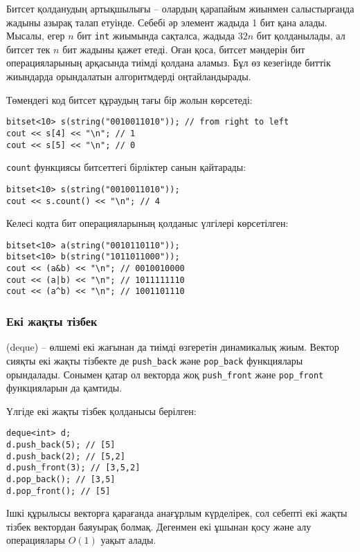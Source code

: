 Битсет қолданудың артықшылығы -- олардың қарапайым
жиынмен салыстырғанда жадыны азырақ талап етуінде. Себебі 
әр элемент жадыда 1 бит қана алады.
Мысалы, егер $n$ бит \texttt{int} жиымында сақталса,
жадыда $32n$ бит қолданылады, ал битсет тек $n$ бит
жадыны қажет етеді. Оған қоса, битсет мәндерін бит операцияларының арқасында 
тиімді қолдана аламыз. Бұл өз кезегінде биттік жиындарда орындалатын алгоритмдерді
оңтайландырады.

Төмендегі код битсет құраудың тағы бір жолын көрсетеді:
\begin{lstlisting}
bitset<10> s(string("0010011010")); // from right to left
cout << s[4] << "\n"; // 1
cout << s[5] << "\n"; // 0
\end{lstlisting}

\texttt{count} функциясы битсеттегі бірліктер санын қайтарады:

\begin{lstlisting}
bitset<10> s(string("0010011010"));
cout << s.count() << "\n"; // 4
\end{lstlisting}

Келесі кодта бит операцияларының қолданыс үлгілері көрсетілген:
\begin{lstlisting}
bitset<10> a(string("0010110110"));
bitset<10> b(string("1011011000"));
cout << (a&b) << "\n"; // 0010010000
cout << (a|b) << "\n"; // 1011111110
cout << (a^b) << "\n"; // 1001101110
\end{lstlisting}

\subsubsection{Екі жақты тізбек}

 (deque) -- өлшемі екі жағынан да тиімді өзгеретін динамикалық жиым.
Вектор сияқты екі жақты тізбекте де \texttt{push\_back} және \texttt{pop\_back}
функциялары орындалады. Сонымен қатар ол векторда жоқ \texttt{push\_front}
және \texttt{pop\_front} функцияларын да қамтиды.

Үлгіде екі жақты тізбек қолданысы берілген:
\begin{lstlisting}
deque<int> d;
d.push_back(5); // [5]
d.push_back(2); // [5,2]
d.push_front(3); // [3,5,2]
d.pop_back(); // [3,5]
d.pop_front(); // [5]
\end{lstlisting}

Ішкі құрылысы векторға қарағанда анағұрлым күрделірек, сол себепті
екі жақты тізбек вектордан баяуырақ болмақ.
Дегенмен екі ұшынан қосу және алу операциялары $O(1)$ уақыт алады.

